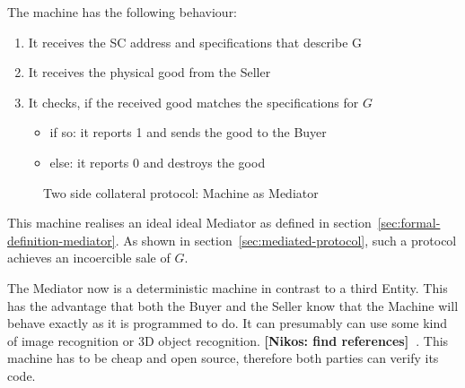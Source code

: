 \documentclass{cacthesis}
\newcommand{\authnote}[3]{{ \footnotesize \textbf{#1[#2: #3]~}}}
\newcommand{\niknote}[1]{\authnote{\color{red}}{Nikos}{#1}}
\begin{document}
The machine has the following behaviour:
\begin{enumerate}
    \item It receives the SC address and specifications that describe G
    \item It receives the physical good from the Seller
    \item It checks, if the received good matches the specifications for $G$
        \begin{itemize}
            \item if so: it reports 1 and sends the good to the Buyer
            \item else: it reports 0 and destroys the good
        \end{itemize}
\end{enumerate}

\begin{figure}[htb!]
    \centering
    \caption{Two side collateral protocol: Machine as Mediator}
    \label{pro:two-side-collateral-machine}
\end{figure}

This machine realises an ideal ideal Mediator as defined in section~\ref{sec:formal-definition-mediator}. As shown in section~\ref{sec:mediated-protocol}, such a protocol achieves an incoercible sale of $G$.\newline

The Mediator now is a deterministic machine in contrast to a third Entity. This has the advantage that both the Buyer and the Seller know that the Machine will behave exactly as it is programmed to do. It can presumably can use some kind of image recognition or 3D object recognition. \niknote{find references}. This machine has to be cheap
and open source, therefore both parties can verify its code.\newline 
\end{document}
